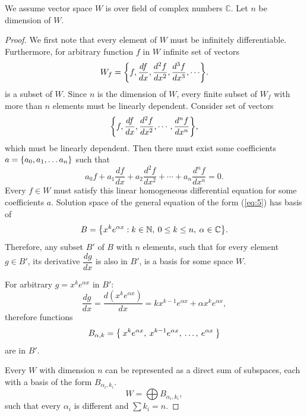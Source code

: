 \documentclass{article}
\theoremstyle{definition}
\newcommand{\N}{\mathbb{N}}
\newcommand{\C}{\mathbb{C}}
\DeclarePairedDelimiter\set{\{}{\}}
\begin{document}
We assume vector space $W$ is over field of complex numbers $\C$.
Let $n$ be dimension of $W$.

\begin{proof}

We first note that every element of $W$ must be infinitely differentiable.
Furthermore, for arbitrary function $f$ in $W$ infinite set of vectors
\[ W_f = \set*{f, \frac{df}{dx}, \frac{d^2 f}{dx^2}, \frac{d^3 f}{dx^3}, \cdots }. \]
is a subset of $W$.
Since $n$ is the dimension of $W$, every finite subset of $W_f$ with more than $n$ elements must be linearly dependent.
Consider set of vectors
\[ \set*{ f, \frac{df}{dx}, \frac{d^2 f}{dx^2}, \cdots, \frac{d^n f}{dx^n} }, \]
which must be linearly dependent.
Then there must exist some coefficients $a = \set{a_0, a_1, \dots a_n}$ such that
\begin{equation} \label{eq:5}
a_0 f + a_1 \frac{df}{dx} + a_2 \frac{d^2 f}{dx^2} + \cdots + a_n \frac{d^n f}{dx^n} = 0.
\end{equation}
Every $f \in W$ must satisfy this linear homogeneous differential equation for some coefficients $a$.
Solution space of the general equation of the form (\ref{eq:5}) has basis of
\[ B = \set*{ x^k e^{\alpha x} : k \in \N, \> 0 \leq k \leq n, \> \alpha \in \C }. \]
Therefore, any subset $B'$ of $B$ with $n$ elements, such that for every element $g \in B'$, its derivative $\dfrac{dg}{dx}$ is also in $B'$, is a basis for some space $W$.

For arbitrary $g = x^k e^{\alpha x}$ in $B'$:
\[ \frac{dg}{dx} = \frac{d(x^k e^{\alpha x})}{dx} = k x^{k-1} e^{\alpha x} + \alpha x^k e^{\alpha x}, \]
therefore functions
\[
    B_{\alpha, k} = \set*{ \>
        x^k e^{\alpha x}, \>
        x^{k-1} e^{\alpha x}, \>
        \dots, \>
        e^{\alpha x} \>
    }
\]
are in $B'$.

Every $W$ with dimension $n$ can be represented as a direct sum of subspaces, each with a basis of the form $B_{\alpha_i, k_i}$.
\[ W = \bigoplus B_{\alpha_i,k_i}, \]
such that every $\alpha_i$ is different and  $\sum k_i = n$.

\end{proof}
\end{document}
